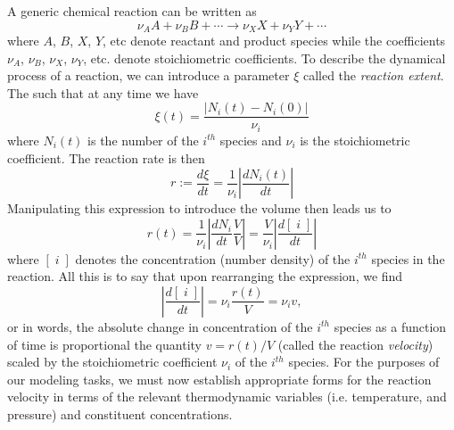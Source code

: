 A generic chemical reaction can be written as
\begin{equation}
  \nu_{A}A + \nu_{B}B + \cdots \longrightarrow \nu_{X}X + \nu_{Y}Y + \cdots
\end{equation}
where $A$, $B$, $X$, $Y$, etc denote reactant and product species while the coefficients $\nu_{A}$, $\nu_{B}$, $\nu_{X}$, $\nu_{Y}$, etc.  denote stoichiometric coefficients. To describe the dynamical process of a reaction, we can introduce a parameter $\xi$ called the \textit{reaction extent}. The such that at any time we have
\begin{equation}
  \xi(t) = \frac{\lvert N_i(t) - N_i(0) \rvert}{ \nu_i}
\end{equation}
where $N_i(t)$ is the number  of the $i^{th}$ species and $\nu_i$ is the stoichiometric coefficient. The reaction rate is then
\begin{equation}
  r := \frac{d\xi}{dt} = \frac{1}{\nu_i}\left\lvert \frac{dN_i(t)} { dt} \right\rvert
\end{equation}
Manipulating this expression to introduce the volume then leads us to
\begin{equation}
  r(t) = \frac{1}{\nu_i}\left\lvert\frac{dN_i}{dt}\frac{V}{V} \right\rvert = \frac{V}{\nu_i}\left\lvert \frac{d[\;i\;]}{dt} \right\rvert
\end{equation}
where $[\;i\;]$ denotes the concentration (number density) of the $i^{th}$ species in the reaction. All this is to say that upon rearranging the expression, we find
\begin{equation}
  \left\lvert \frac{d[\;i\;]}{dt} \right\rvert = \nu_i\frac{r(t)}{V} = \nu_iv,
\end{equation}
or in words, the absolute change in concentration of the $i^{th}$ species as a function of time is proportional the quantity $v=r(t)/V$ (called the reaction \textit{velocity}) scaled by the stoichiometric coefficient $\nu_i$ of the $i^{th}$ species. For the purposes of our modeling tasks, we must now establish appropriate forms for the reaction velocity in terms of the relevant thermodynamic variables (i.e. temperature, and pressure) and constituent concentrations.


